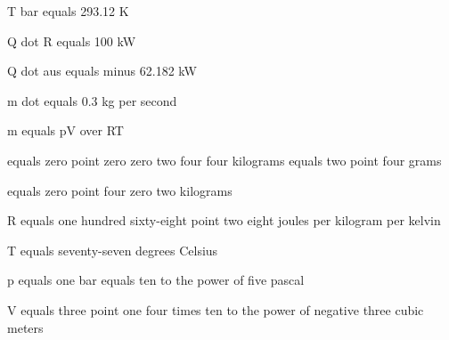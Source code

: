 T bar equals 293.12 K

Q dot R equals 100 kW

Q dot aus equals minus 62.182 kW

m dot equals 0.3 kg per second

m equals pV over RT

equals zero point zero zero two four four kilograms equals two point four grams

equals zero point four zero two kilograms

R equals one hundred sixty-eight point two eight joules per kilogram per kelvin

T equals seventy-seven degrees Celsius

p equals one bar equals ten to the power of five pascal

V equals three point one four times ten to the power of negative three cubic meters